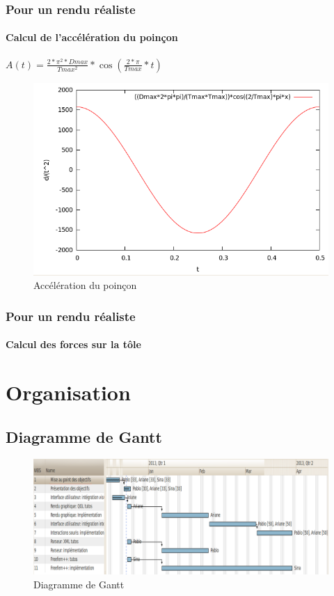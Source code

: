 \documentclass{beamer}
\begin{document}
\begin{frame}
    \frametitle{Pour un rendu réaliste}
    \framesubtitle{Calcul de l'accélération du poinçon}
    \begin{center}
        $A(t) = \frac{2*\pi^2*Dmax}{Tmax^2}*\cos(\frac{2*\pi}{Tmax}*t)$
    \end{center}
    \begin{figure}
        \includegraphics[width=.7\textwidth]{img/acceleration.png}
        \caption{Accélération du poinçon}
        \label{Accélération}
    \end{figure}
\end{frame}
\begin{frame}
    \frametitle{Pour un rendu réaliste}
    \framesubtitle{Calcul des forces sur la tôle}
\end{frame}

\section{Organisation}
\subsection{Diagramme de Gantt}
\begin{frame}
    \begin{figure}
        \includegraphics[width=\textwidth]{img/gantt.png}
        \caption{Diagramme de Gantt}
        \label{DiagrammeDeGant}
    \end{figure}
\end{frame}
\end{document}
